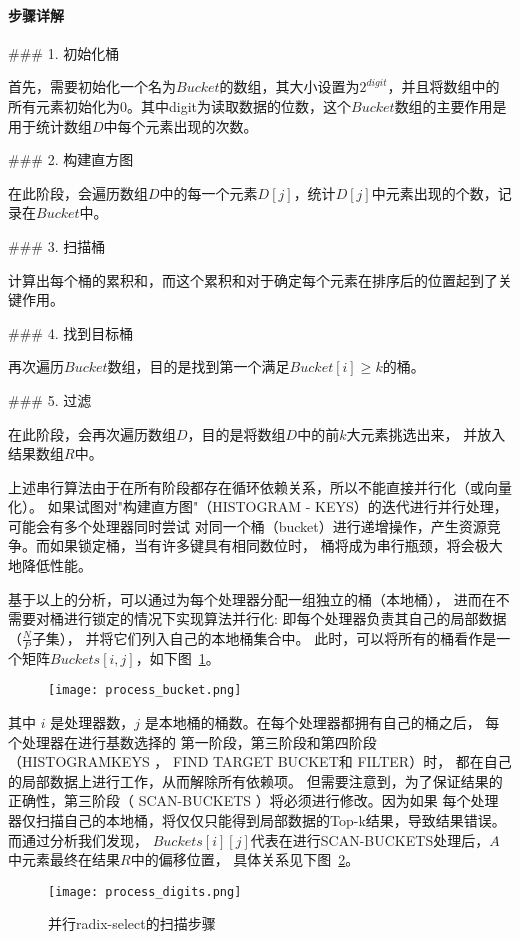   \paragraph{步骤详解}

 ### 1. 初始化桶

  首先，需要初始化一个名为\(Bucket\)的数组，其大小设置为\(2^{digit}\)，并且将数组中的所有元素初始化为\(0\)。其中digit为读取数据的位数，这个\(Bucket\)数组的主要作用是用于统计数组\(D\)中每个元素出现的次数。
  
  ### 2. 构建直方图

 在此阶段，会遍历数组\(D\)中的每一个元素\(D[j]\)，统计\(D[j]\)中元素出现的个数，记录在\(Bucket\)中。
  
 ### 3. 扫描桶

 计算出每个桶的累积和，而这个累积和对于确定每个元素在排序后的位置起到了关键作用。

  ### 4. 找到目标桶

再次遍历\(Bucket\)数组，目的是找到第一个满足\(Bucket[i] \geq k\)的桶。

  ### 5. 过滤

  在此阶段，会再次遍历数组\(D\)，目的是将数组\(D\)中的前\(k\)大元素挑选出来，
  并放入结果数组\(R\)中。

  上述串行算法由于在所有阶段都存在循环依赖关系，所以不能直接并行化（或向量化）。
  如果试图对"构建直方图"（HISTOGRAM - KEYS）的迭代进行并行处理，可能会有多个处理器同时尝试
  对同一个桶（bucket）进行递增操作，产生资源竞争。而如果锁定桶，当有许多键具有相同数位时，
  桶将成为串行瓶颈，将会极大地降低性能。

  基于以上的分析，可以通过为每个处理器分配一组独立的桶（本地桶），
进而在不需要对桶进行锁定的情况下实现算法并行化:
即每个处理器负责其自己的局部数据（\(\frac{N}{P}\)子集），
并将它们列入自己的本地桶集合中。
此时，可以将所有的桶看作是一个矩阵\(Buckets[i, j]\)，如下图~\ref{fig:process_bucket}。

\begin{figure}[ht]
    \centering
    \texttt{[image: process\_bucket.png]}
    \caption{}
    \label{fig:process_bucket}
\end{figure}

其中 $i$ 是处理器数，$j$ 是本地桶的桶数。在每个处理器都拥有自己的桶之后，
每个处理器在进行基数选择的
第一阶段，第三阶段和第四阶段（HISTOGRAMKEYS ， FIND TARGET BUCKET和 FILTER）时，
都在自己的局部数据上进行工作，从而解除所有依赖项。
但需要注意到，为了保证结果的正确性，第三阶段（ SCAN-BUCKETS ）将必须进行修改。因为如果
每个处理器仅扫描自己的本地桶，将仅仅只能得到局部数据的Top-k结果，导致结果错误。而通过分析我们发现，
$Buckets[i][j]$代表在进行SCAN-BUCKETS处理后，$A$中元素最终在结果$R$中的偏移位置，
具体关系见下图~\ref{fig:digits}。
\begin{figure}[ht]
    \centering
    \texttt{[image: process\_digits.png]}
    \caption{并行radix-select的扫描步骤}
    \label{fig:digits}
\end{figure}

